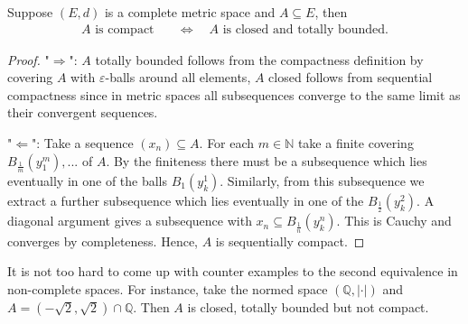 \begin{llemma}
\begin{prop}
	Suppose $(E,d)$ is a complete metric space and $A\subseteq E$, then
	\begin{align*}
		A\text{ is compact}\quad& \Longleftrightarrow \quad A\text{ is closed and totally bounded}.
	\end{align*} 
	\end{prop}
\end{llemma}
\begin{proof}[Proof]
"$\Rightarrow$": $A$ totally bounded follows from the compactness definition by covering $A$ with $\varepsilon$-balls around all elements, $A$ closed follows from sequential compactness since in metric spaces all subsequences converge to the same limit as their convergent sequences.\smallskip

"$\Leftarrow$": Take a sequence $(x_n) \subseteq A$. For each $m\in\mathbb{N}$ take a finite covering $B_{\frac{1}{m}}(y_1^m),...$ of $A$. By the finiteness there must be a subsequence which lies eventually in one of the balls $B_1(y_k^1)$. Similarly, from this subsequence we extract a further subsequence which lies eventually in one of the $B_{\frac{1}{2}}(y_k^2)$. A diagonal argument gives a subsequence with $x_n \subseteq B_{\frac{1}{n}}(y_k^n)$. This is Cauchy and converges by completeness. Hence, $A$ is sequentially compact.
\end{proof}
It is not too hard to come up with counter examples to the second equivalence in non-complete spaces. For instance, take the normed space $(\mathbb{Q},|\cdot| )$ and $A = (-\sqrt{2},\sqrt{2})\cap \mathbb{Q}$. Then $A$ is closed, totally bounded but not compact.\smallskip


